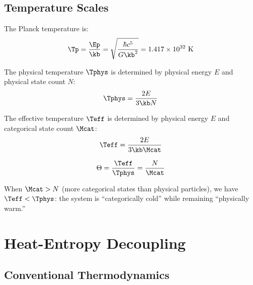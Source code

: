 \subsection{Temperature Scales}

\begin{definition}
The Planck temperature is:
\begin{equation}
\Tp = \frac{\Ep}{\kb} = \sqrt{\frac{\hbar c^5}{G \kb^2}} = 1.417 \times 10^{32} \text{ K}
\end{equation}
\end{definition}

\begin{definition}
The physical temperature $\Tphys$ is determined by physical energy $E$ and physical state count $N$:
\begin{equation}
\Tphys = \frac{2E}{3\kb N}
\end{equation}
\end{definition}

\begin{definition}
The effective temperature $\Teff$ is determined by physical energy $E$ and categorical state count $\Mcat$:
\begin{equation}
\Teff = \frac{2E}{3\kb \Mcat}
\end{equation}
\end{definition}

\begin{definition}
\begin{equation}
\Theta = \frac{\Teff}{\Tphys} = \frac{N}{\Mcat}
\end{equation}
\end{definition}

When $\Mcat > N$ (more categorical states than physical particles), we have $\Teff < \Tphys$: the system is ``categorically cold'' while remaining ``physically warm.''

\section{Heat-Entropy Decoupling}

\subsection{Conventional Thermodynamics}

